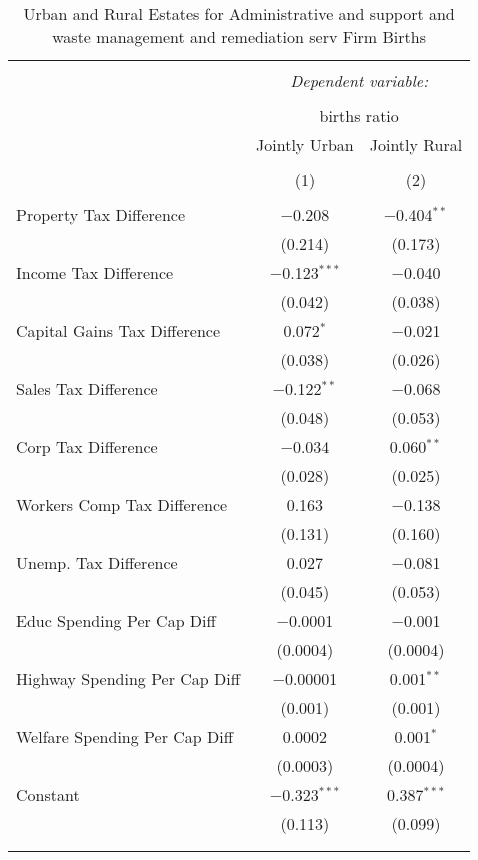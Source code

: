 
\begin{table}[!htbp] \centering 
  \caption{Urban and Rural Estates for  Administrative and support and waste management and remediation serv Firm Births} 
  \label{} 
\begin{tabular}{@{\extracolsep{5pt}}lcc} 
\\[-1.8ex]\hline 
\hline \\[-1.8ex] 
 & \multicolumn{2}{c}{\textit{Dependent variable:}} \\ 
\cline{2-3} 
\\[-1.8ex] & \multicolumn{2}{c}{births ratio} \\ 
 & Jointly Urban & Jointly Rural \\ 
\\[-1.8ex] & (1) & (2)\\ 
\hline \\[-1.8ex] 
 Property Tax Difference & $-$0.208 & $-$0.404$^{**}$ \\ 
  & (0.214) & (0.173) \\ 
  Income Tax Difference & $-$0.123$^{***}$ & $-$0.040 \\ 
  & (0.042) & (0.038) \\ 
  Capital Gains Tax Difference & 0.072$^{*}$ & $-$0.021 \\ 
  & (0.038) & (0.026) \\ 
  Sales Tax Difference & $-$0.122$^{**}$ & $-$0.068 \\ 
  & (0.048) & (0.053) \\ 
  Corp Tax Difference & $-$0.034 & 0.060$^{**}$ \\ 
  & (0.028) & (0.025) \\ 
  Workers Comp Tax Difference & 0.163 & $-$0.138 \\ 
  & (0.131) & (0.160) \\ 
  Unemp. Tax Difference & 0.027 & $-$0.081 \\ 
  & (0.045) & (0.053) \\ 
  Educ Spending Per Cap Diff & $-$0.0001 & $-$0.001 \\ 
  & (0.0004) & (0.0004) \\ 
  Highway Spending Per Cap Diff & $-$0.00001 & 0.001$^{**}$ \\ 
  & (0.001) & (0.001) \\ 
  Welfare Spending Per Cap Diff & 0.0002 & 0.001$^{*}$ \\ 
  & (0.0003) & (0.0004) \\ 
  Constant & $-$0.323$^{***}$ & 0.387$^{***}$ \\ 
  & (0.113) & (0.099) \\ 
 \hline \\[-1.8ex] 
\hline 
\hline \\[-1.8ex] 
\end{tabular} 
\end{table} 
